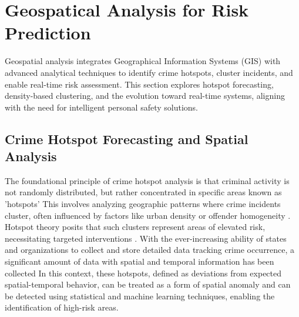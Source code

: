 \documentclass[12pt,a4paper,oneside,english]{book}
\begin{document}
{\section{Geospatical Analysis for Risk Prediction}
\label{sec:geospatial_theory}

Geospatial analysis integrates Geographical Information Systems (GIS) with advanced analytical techniques to identify crime hotspots, cluster incidents, and enable real-time risk assessment. This section explores hotspot forecasting, density-based clustering, and the evolution toward real-time systems, aligning with the need for intelligent personal safety solutions.



\subsection{Crime Hotspot Forecasting and Spatial Analysis}



The foundational principle of crime hotspot analysis is that criminal activity is not randomly 
distributed, but rather concentrated in specific areas known as 'hotspots'
This involves analyzing geographic patterns where crime incidents cluster,
often influenced by factors like urban density or offender homogeneity \cite{chen2019exploring}. 
Hotspot theory posits that such clusters represent areas of elevated risk, necessitating targeted interventions  \cite{zhuang2017crime} .
With the ever-increasing ability of states and organizations to collect and store detailed data tracking crime occurrence, a significant amount of data with spatial and temporal information has been collected
In this context, these hotspots, defined as deviations from expected spatial-temporal behavior, can be treated as a form of spatial anomaly and can be detected using statistical and machine learning techniques, enabling the identification of high-risk areas.

}
\end{document}

